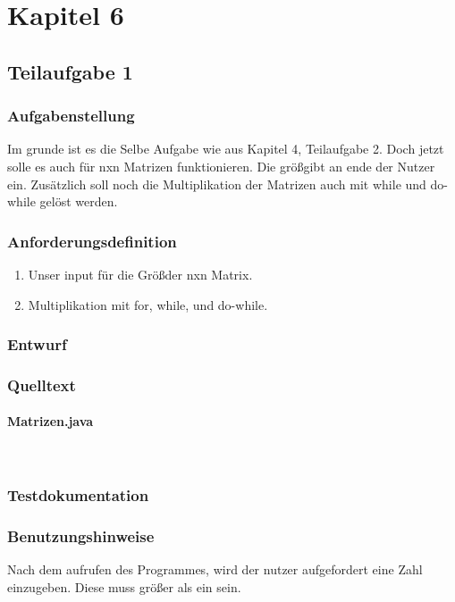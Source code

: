 \section{Kapitel 6}
\subsection{Teilaufgabe 1}
\subsubsection{Aufgabenstellung}
Im grunde ist es die Selbe Aufgabe wie aus Kapitel 4, Teilaufgabe 2. Doch jetzt solle es auch
für nxn Matrizen funktionieren. Die grö\ss\space gibt an ende der Nutzer ein. Zusätzlich soll
noch die Multiplikation der Matrizen auch mit while und do-while gelöst werden.

\subsubsection{Anforderungsdefinition}
\begin{enumerate}
	\item Unser input für die Grö\ss\space der nxn Matrix.
	\item Multiplikation mit for, while, und do-while.
\end{enumerate}

\subsubsection{Entwurf}


\subsubsection{Quelltext}
\paragraph{Matrizen.java}\


\subsubsection{Testdokumentation}

\subsubsection{Benutzungshinweise}
Nach dem aufrufen des Programmes, wird der nutzer aufgefordert eine Zahl einzugeben.
Diese muss grö\ss er als ein sein.

